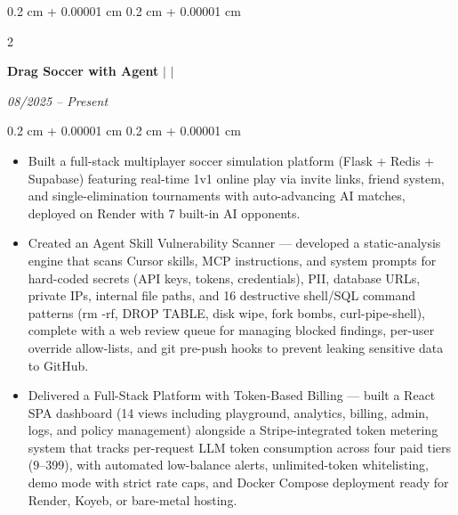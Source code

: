 \documentclass[10pt, letterpaper]{article}
\newenvironment{highlights}{
    \begin{itemize}[
        topsep=0.03 cm,
        parsep=0.03 cm,
        partopsep=0pt,
        itemsep=0pt,
        leftmargin=0.4 cm + 10pt
    ]
}{
    \end{itemize}
} %
\newenvironment{onecolentry}{
    \begin{adjustwidth}{
        0.2 cm + 0.00001 cm
    }{
        0.2 cm + 0.00001 cm
    }
}{
    \end{adjustwidth}
} %
\newenvironment{twocolentry}[2][]{
    \onecolentry
    \def\secondColumn{#2}
    \setcolumnwidth{\fill, 3.5 cm}
    \begin{paracol}{2}
}{
    \switchcolumn \raggedleft \secondColumn
    \end{paracol}
    \endonecolentry
} %
\let\hrefWithoutArrow\href
\renewcommand{\href}[2]{\hrefWithoutArrow{#1}{\ifthenelse{\equal{#2}{}}{ }{#2 }\raisebox{.15ex}{\footnotesize \faExternalLink*}}}
\begin{document}
    \begin{twocolentry}{\textit{08/2025 -- Present}}
        \color{primaryColor}\textbf{Drag Soccer with Agent} $\vert$ 
        \href{https://drag-soccer-with-agent.onrender.com/}{\color{primaryColor}\textbf{Try it out}} $\vert$
        \href{https://github.com/NghiemNgocDuc/Drag_Soccer_with_Agent}{\color{primaryColor}\textbf{Github}} 
        
    \end{twocolentry}
    \begin{onecolentry}
        \begin{highlights}
            \item Built a full-stack multiplayer soccer simulation platform (Flask + Redis + Supabase) featuring real-time 1v1 online play via invite links, friend system, and single-elimination tournaments with auto-advancing AI matches, deployed on Render with 7 built-in AI opponents.
            \item Created an Agent Skill Vulnerability Scanner — developed a static-analysis engine that scans Cursor skills, MCP instructions, and system prompts for hard-coded secrets (API keys, tokens, credentials), PII, database URLs, private IPs, internal file paths, and 16 destructive shell/SQL command patterns (rm -rf, DROP TABLE, disk wipe, fork bombs, curl-pipe-shell), complete with a web review queue for managing blocked findings, per-user override allow-lists, and git pre-push hooks to prevent leaking sensitive data to GitHub.
            \item Delivered a Full-Stack Platform with Token-Based Billing — built a React SPA dashboard (14 views including playground, analytics, billing, admin, logs, and policy management) alongside a Stripe-integrated token metering system that tracks per-request LLM token consumption across four paid tiers ($9–$399), with automated low-balance alerts, unlimited-token whitelisting, demo mode with strict rate caps, and Docker Compose deployment ready for Render, Koyeb, or bare-metal hosting.
        \end{highlights}
    \end{onecolentry}
\end{document}
